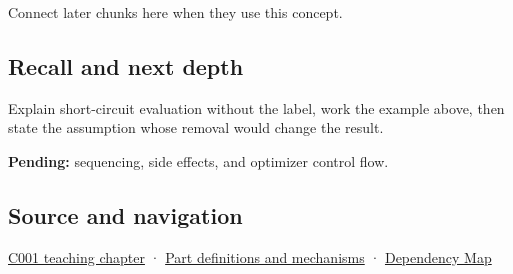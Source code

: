Connect later chunks here when they use this concept.

\subsection{Recall and next depth}\label{appendix-2e245a6fa8d3-recall-and-next-depth}

Explain short-circuit evaluation without the label, work the example above, then state the assumption whose removal would change the result.

\textbf{Pending:} sequencing, side effects, and optimizer control flow.

\subsection{Source and navigation}\label{appendix-2e245a6fa8d3-source-and-navigation}

\hyperref[01-foundations-i-ch001-from-a-signal-to-an-interpretation]{C001 teaching chapter} · \hyperref[appendix-fd090d982a15]{Part definitions and mechanisms} · \hyperref[appendix-4ad47bdd269a]{Dependency Map}
